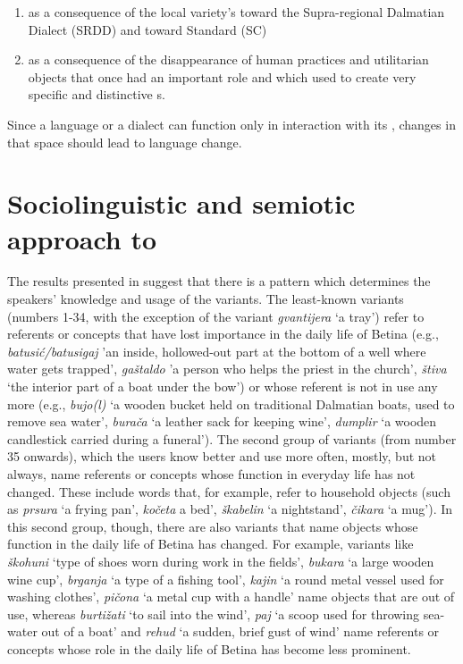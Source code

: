 \documentclass[output=paper]{LSP/langsci}
\begin{document}
\begin{enumerate}
\item as a consequence of the local variety’s  toward the Supra-regional Dalmatian Dialect (SRDD) and toward Standard  (SC)
\item as a consequence of the disappearance of human practices and utilitarian objects that once had an important role and which used to create very specific and distinctive s. 
\end{enumerate}

Since a language or a dialect can function only in interaction with its , changes in that space should lead to language change. 

\section{Sociolinguistic and semiotic approach to }
The results presented in  suggest that there is a pattern which determines the speakers’ knowledge and usage of the variants. The least-known variants (numbers 1-34, with the exception of the variant \textit{gvantijera} ‘a tray’) refer to referents or concepts that have lost importance in the daily life of Betina (e.g., \textit{batusić/batusigaj} 'an inside, hollowed-out part at the bottom of a well where water gets trapped', \textit{gaštaldo} 'a person who helps the priest in the church', \textit{štiva} ‘the interior part of a boat under the bow') or whose referent is not in use any more (e.g., \textit{bujo(l)} ‘a wooden bucket held on traditional Dalmatian boats, used to remove sea water’, \textit{burača} ‘a leather sack for keeping wine’, \textit{dumplir} ‘a wooden candlestick carried during a funeral’). 
The second group of variants (from number 35 onwards), which the users know better and use more often, mostly, but not always, name referents or concepts whose function in everyday life has not changed. These include words that, for example, refer to household objects (such as \textit{prsura} ‘a frying pan’, \textit{kočeta} a bed’, \textit{škabelin} ‘a nightstand’, \textit{čikara} ‘a mug’). In this second group, though, there are also variants that name objects whose function in the daily life of Betina has changed. For example, variants like \textit{škohuni} ‘type of shoes worn during work in the fields’, \textit{bukara} ‘a large wooden wine cup’, \textit{brganja} ‘a type of a fishing tool’, \textit{kajin} ‘a round metal vessel used for washing clothes’, \textit{pičona} ‘a metal cup with a handle’ name objects that are out of use, whereas \textit{burtižati} ‘to sail into the wind’, \textit{paj} ‘a scoop used for throwing sea-water out of a boat’ and \textit{rehud} ‘a sudden, brief gust of wind’ name referents or concepts whose role in the daily life of Betina has become less prominent. 
\end{document}
